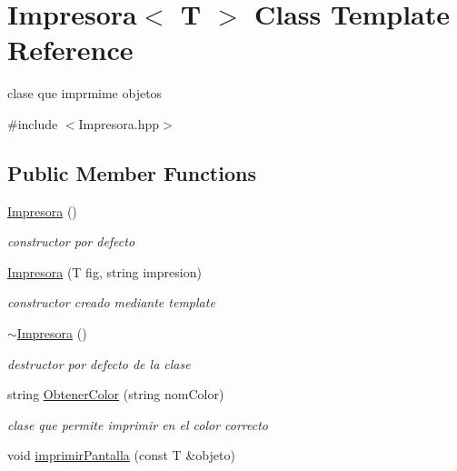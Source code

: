 \hypertarget{class_impresora}{}\section{Impresora$<$ T $>$ Class Template Reference}
\label{class_impresora}


clase que imprmime objetos  




{\ttfamily \#include $<$Impresora.\+hpp$>$}

\subsection*{Public Member Functions}
\begin{DoxyCompactItemize}
\item 
\mbox{\label{class_impresora_a68f5ddc334afffb8715f6a6a06ee917b}} 
\hyperlink{class_impresora_a68f5ddc334afffb8715f6a6a06ee917b}{Impresora} ()
\begin{DoxyCompactList}\small\item\em constructor por defecto \end{DoxyCompactList}\item 
\hyperlink{class_impresora_a82093c181cb0601fc82dbbeff7247763}{Impresora} (T fig, string impresion)
\begin{DoxyCompactList}\small\item\em constructor creado mediante template \end{DoxyCompactList}\item 
\mbox{\label{class_impresora_a6e8f0ae96313109222fe715137f68b3e}} 
\hyperlink{class_impresora_a6e8f0ae96313109222fe715137f68b3e}{$\sim$\+Impresora} ()
\begin{DoxyCompactList}\small\item\em destructor por defecto de la clase \end{DoxyCompactList}\item 
string \hyperlink{class_impresora_abab8709ec339f549ef44dae439b33f12}{Obtener\+Color} (string nom\+Color)
\begin{DoxyCompactList}\small\item\em clase que permite imprimir en el color correcto \end{DoxyCompactList}\item 
void \hyperlink{class_impresora_a7427f11d194603c5ae2b7f4837c49f14}{imprimir\+Pantalla} (const T \&objeto)

\end{DoxyCompactItemize}
